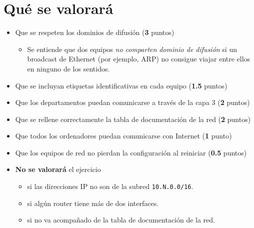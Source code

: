 \section{Qué se valorará}
\begin{itemize}
\item Que se respeten los dominios de difusión (\textbf{3} puntos)
  \begin{itemize}
  \item Se entiende que dos equipos \textit{no comparten dominio de difusión} si un broadcast de Ethernet (por ejemplo, ARP) no consigue viajar entre ellos en ninguno de los sentidos.
  \end{itemize}
\item Que se incluyan etiquetas identificativas en cada equipo (\textbf{1.5} puntos)  
\item Que los departamentos puedan comunicarse a través de la capa 3 (\textbf{2} puntos)
\item Que se rellene correctamente la tabla de documentación de la red (\textbf{2} puntos)
\item Que todos los ordenadores puedan comunicarse con Internet (\textbf{1} punto)
\item Que los equipos de red no pierdan la configuración al reiniciar (\textbf{0.5} puntos)
\item \textbf{No se valorará} el ejercicio
  \begin{itemize}
  \item si las direcciones IP no son de la subred \texttt{10.N.0.0/16}.
  \item si algún router tiene más de dos interfaces.
  \item si no va acompañado de la tabla de documentación de la red.
  \end{itemize}
\end{itemize}




